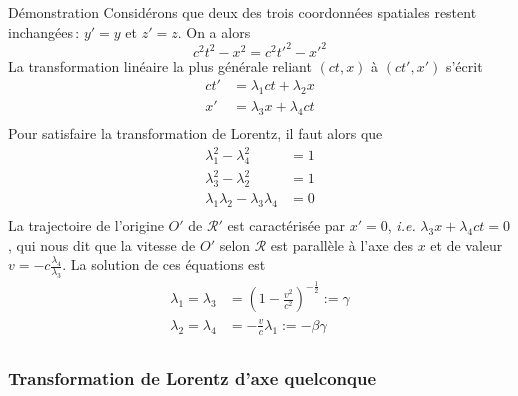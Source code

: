         \begin{omed}{Démonstration}
            Considérons que deux des trois coordonnées spatiales restent inchangées : $y' = y$ et $z' = z$. On a alors 
            \[ c^2 t^2 - x^2 = c^2 t'^2 - x'^2 \]   
            La transformation linéaire la plus générale reliant $(ct, x)$ à $(ct', x')$ s’écrit 
        \begin{align*}
            ct' &= \lambda_1 ct + \lambda_2 x \\
            x' &= \lambda_3 x + \lambda_4 ct \\
        \end{align*}
        Pour satisfaire la transformation de Lorentz, il faut alors que
        \begin{align*}
            \lambda_1^2 - \lambda_4^2 &= 1 \\
            \lambda_3^2 - \lambda_2^2 &= 1 \\
            \lambda_1 \lambda_2 - \lambda_3 \lambda_4 &= 0 \\
        \end{align*}
        La trajectoire de l’origine $O'$ de $\mathcal{R}'$ est caractérisée par $x' = 0$, \textit{i.e.} $\lambda_3 x + \lambda_4 ct = 0$, qui nous dit que la vitesse de $O'$ selon $\mathcal{R}$ est parallèle à l’axe des $x$ et de valeur $v = -c \frac{\lambda_4}{\lambda_3}$. La solution de ces équations est
        \begin{align*}
            \lambda_1 = \lambda_3 &= \left(1 - \frac{v^2}{c^2}\right)^{-\frac{1}{2}} := \gamma \\
            \lambda_2 = \lambda_4 &= - \frac{v}{c} \lambda_1 := - \beta \gamma \\
        \end{align*}
        \end{omed}

        \subsubsection{Transformation de Lorentz d’axe quelconque}

